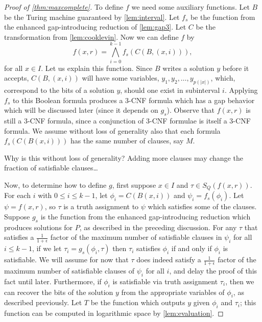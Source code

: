 \documentclass[]{article}
\begin{document}
\begin{proof}[Proof of \autoref{thm:maxcomplete}]
  To define $f$ we need some auxiliary functions.
  Let $B$ be the Turing machine guaranteed by \autoref{lem:interval}.
  Let $f_s$ be the function from the enhanced gap-introducing reduction of \autoref{lem:gap3}.
  Let $C$ be the transformation from \autoref{lem:cooklevin}.
  Now we can define $f$ by
  \begin{displaymath}
    f(x, r) = \bigwedge_{i = 0}^{k - 1}{f_s(C(B, (x, i)))},
  \end{displaymath}
  for all $x \in I$.
  Let us explain this function.
  Since $B$ writes a solution $y$ before it accepts, $C(B, (x, i))$ will have some variables, $y_1, y_2, \dotsc, y_{p(|x|)}$, which, correspond to the bits of a solution $y$, should one exist in subinterval $i$.
  Applying $f_s$ to this Boolean formula produces a 3-CNF formula which has a gap behavior which will be discussed later (since it depends on $g_s$).
  Observe that $f(x, r)$ is still a 3-CNF formula, since a conjunction of 3-CNF formulae is itself a 3-CNF formula.
  We assume without loss of generality also that each formula $f_s(C(B(x, i)))$ has the same number of clauses, say $M$.
  \begin{todo}
    Why is this without loss of generality?
    Adding more clauses may change the fraction of satisfiable clauses\ldots
  \end{todo}

  Now, to determine how to define $g$, first suppose $x \in I$ and $\tau \in S_Q(f(x, r))$.
  For each $i$ with $0 \leq i \leq k - 1$, let $\phi_i = C(B(x, i))$ and $\psi_i = f_s(\phi_i)$.
  Let $\psi = f(x, r)$, so $\tau$ is a truth assignment to $\psi$ which satisfies some of the clauses.
  Suppose $g_s$ is the function from the enhanced gap-introducing reduction which produces solutions for $P$, as described in the preceding discussion.
  For any $\tau$ that satisfies a $\frac{1}{1 + \epsilon}$ factor of the maximum number of satisfiable clauses in $\psi_i$ for all $i \leq k - 1$, if we let $\tau_i = g_s(\phi_i, \tau)$ then $\tau_i$ satisfies $\phi_i$ if and only if $\phi_i$ is satisfiable.
  We will assume for now that $\tau$ does indeed satisfy a $\frac{1}{1 + \epsilon}$ factor of the maximum number of satisfiable clauses of $\psi_i$ for all $i$, and delay the proof of this fact until later.
  Furthermore, if $\phi_i$ is satisfiable via truth assignment $\tau_i$, then we can recover the bits of the solution $y$ from the appropriate variables of $\phi_i$, as described previously.
  Let $T$ be the function which outputs $y$ given $\phi_i$ and $\tau_i$; this function can be computed in logarithmic space by \autoref{lem:evaluation}.


\end{proof}
\end{document}
